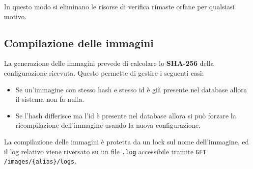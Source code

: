 In questo modo si eliminano le risorse di verifica rimaste orfane per
qualsiasi motivo.

\subsection{Compilazione delle
immagini}\label{compilazione-delle-immagini}

La generazione delle immagini prevede di calcolare lo \textbf{SHA-256}
della configurazione ricevuta. Questo permette di gestire i seguenti
casi:

\begin{itemize}
\tightlist
\item
  Se un'immagine con stesso hash e stesso id è già presente nel database
  allora il sistema non fa nulla.
\item
  Se l'hash differisce ma l'id è presente nel database allora si può
  forzare la ricompilazione dell'immagine usando la nuova
  configurazione.
\end{itemize}

La compilazione delle immagini è protetta da un lock sul nome
dell'immagine, ed il log relativo viene riversato su un file
\passthrough{\lstinline!.log!} accessibile tramite
\passthrough{\lstinline!GET /images/\{alias\}/logs!}.
